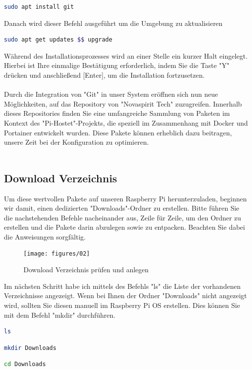 \documentclass[a4paper]{article}
\begin{document}
\begin{lstlisting}[language=bash, caption={Installation GIT}, breaklines=false]
	sudo apt install git
\end{lstlisting}
Danach wird dieser Befehl ausgeführt um die Umgebung zu aktualisieren

\begin{lstlisting}[language=bash, caption={Updaten \& Upgrade des OS}, breaklines=false]
sudo apt get updates $$ upgrade
\end{lstlisting}
Während des Installationsprozesses wird an einer Stelle ein kurzer Halt eingelegt. Hierbei ist Ihre einmalige Bestätigung erforderlich, indem Sie die Taste "Y" drücken und anschließend [Enter], um die Installation fortzusetzen.
\\\\
Durch die Integration von "Git" in unser System eröffnen sich nun neue Möglichkeiten, auf das Repository von "Novaspirit Tech" zuzugreifen. Innerhalb dieses Repositories finden Sie eine umfangreiche Sammlung von Paketen im Kontext des "Pi-Hostet"-Projekts, die speziell im Zusammenhang mit Docker und Portainer entwickelt wurden. Diese Pakete können erheblich dazu beitragen, unsere Zeit bei der Konfiguration zu optimieren.
\\\\
\subsection{Download Verzeichnis}
Um diese wertvollen Pakete auf unseren Raspberry Pi herunterzuladen, beginnen wir damit, einen dedizierten "Downloads"-Ordner zu erstellen. Bitte führen Sie die nachstehenden Befehle nacheinander aus, Zeile für Zeile, um den Ordner zu erstellen und die Pakete darin abzulegen sowie zu entpacken. Beachten Sie dabei die Anweisungen sorgfältig.
\begin{figure}[htbp]
	\centering
	\texttt{[image: figures/02]}
	\caption{Download Verzeichnis prüfen und anlegen}
	\label{fig:Download Verzeichnis}
\end{figure}
Im nächsten Schritt habe ich mittels des Befehls "ls" die Liste der vorhandenen Verzeichnisse angezeigt. Wenn bei Ihnen der Ordner "Downloads" nicht angezeigt wird, sollten Sie diesen manuell im Raspberry Pi OS erstellen. Dies können Sie mit dem Befehl "mkdir" durchführen. 
\begin{lstlisting}[language=bash, caption={Verzeichnis anzeigen}, breaklines=false]
	ls
\end{lstlisting}
\begin{lstlisting}[language=bash, caption={Verzeichnis wechseln}, breaklines=false]
	mkdir Downloads
\end{lstlisting}
\begin{lstlisting}[language=bash, caption={Verzeichnis erstellen}, breaklines=false]
	cd Downloads
\end{lstlisting}
\end{document}
